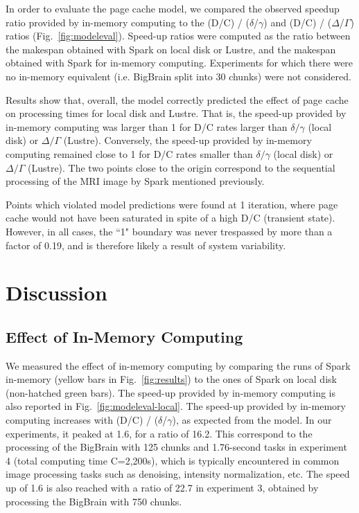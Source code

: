 In order to evaluate the page cache model, we compared the observed 
speedup ratio provided by in-memory computing to the (D/C) / 
($\delta$/$\gamma$) and (D/C) / ($\Delta$/$\Gamma$) ratios 
(Fig.~\ref{fig:modeleval}). Speed-up ratios were computed as the ratio 
between the makespan obtained with Spark on local disk or Lustre, and 
the makespan obtained with Spark for in-memory computing. Experiments 
for which there were no in-memory equivalent (i.e. BigBrain split into 
30 
chunks) 
were not considered.

Results show that, overall, the model correctly predicted the effect of 
page cache on processing times for local disk and Lustre. That is, the 
speed-up provided by in-memory computing was larger than 1 for D/C 
rates larger than $\delta/\gamma$ (local disk) or $\Delta/\Gamma$ 
(Lustre). Conversely, the speed-up provided by in-memory computing 
remained close to 1 for D/C rates smaller than $\delta/\gamma$ (local 
disk) or $\Delta/\Gamma$ (Lustre). The two points close to the origin 
correspond to the sequential processing of the MRI image by Spark 
mentioned previously.

Points which violated 
model predictions were found at 1 iteration, where page cache would not 
have been saturated in spite of a high D/C (transient state). However, 
in all cases, the ``1" boundary was never trespassed by more than a 
factor of 0.19, and is therefore likely a result of system variability.

\section{Discussion} %
\label{sec:discussion}

\subsection{Effect of In-Memory Computing}
We measured the effect of in-memory computing by comparing the runs 
of Spark in-memory (yellow bars in Fig.~\ref{fig:results}) to the ones 
of Spark on local disk (non-hatched green bars). The speed-up provided 
by in-memory computing is also reported in 
Fig.~\ref{fig:modeleval-local}. The speed-up provided by in-memory 
computing increases with (D/C) / ($\delta$/$\gamma$), as expected from 
the model. In our experiments, it peaked at 1.6, for a ratio of 16.2. 
This correspond to the processing of the BigBrain with 125 chunks and 
1.76-second tasks in experiment 4 (total computing time C=2,200s), 
which is typically encountered in common image processing tasks such as 
denoising, intensity normalization, etc. The speed up of 1.6 is also 
reached with a ratio of 22.7 in experiment 3, obtained by processing 
the BigBrain with 750 chunks.

